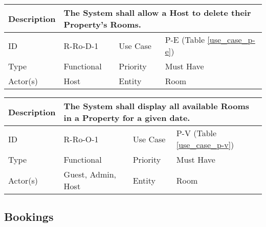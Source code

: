 \begin{tabular}{|p{1.5cm}|p{1.5cm}|p{1.5cm}|p{1.5cm}|p{1.5cm}|p{1.5cm}|p{1.5cm}|p{1.5cm}|p{1.5cm}|p{1.5cm}|p{1.5cm}|p{1.5cm}|}
    \hline
    \multicolumn{2}{|o|}{Description} & \multicolumn{10}{p{12.5cm}|}{The System shall allow a Host to delete their Property's Rooms.} \\ \hline
    \multicolumn{2}{|o|}{ID}          & \multicolumn{4}{n}{R-Ro-D-1}            & \multicolumn{2}{|o|}{Use Case}    & \multicolumn{4}{n|}{P-E (Table \ref{use_case_p-e})} \\ \hline
    \multicolumn{2}{|o|}{Type}        & \multicolumn{4}{n}{Functional}         & \multicolumn{2}{|o|}{Priority}    & \multicolumn{4}{n|}{Must Have}  \\ \hline
    \multicolumn{2}{|o|}{Actor(s)}    & \multicolumn{4}{n}{Host}               & \multicolumn{2}{|o|}{Entity}      & \multicolumn{4}{n|}{Room} \\ \hline
\end{tabular}

\begin{tabular}{|p{1.5cm}|p{1.5cm}|p{1.5cm}|p{1.5cm}|p{1.5cm}|p{1.5cm}|p{1.5cm}|p{1.5cm}|p{1.5cm}|p{1.5cm}|p{1.5cm}|p{1.5cm}|}
    \hline
    \multicolumn{2}{|o|}{Description} & \multicolumn{10}{p{12.5cm}|}{The System shall display all available Rooms in a Property for a given date.} \\ \hline
    \multicolumn{2}{|o|}{ID}          & \multicolumn{4}{n}{R-Ro-O-1}            & \multicolumn{2}{|o|}{Use Case}    & \multicolumn{4}{n|}{P-V (Table \ref{use_case_p-v})} \\ \hline
    \multicolumn{2}{|o|}{Type}        & \multicolumn{4}{n}{Functional}         & \multicolumn{2}{|o|}{Priority}    & \multicolumn{4}{n|}{Must Have}  \\ \hline
    \multicolumn{2}{|o|}{Actor(s)}    & \multicolumn{4}{n}{Guest, Admin, Host} & \multicolumn{2}{|o|}{Entity}      & \multicolumn{4}{n|}{Room} \\ \hline
\end{tabular}

\subsection{Bookings}

